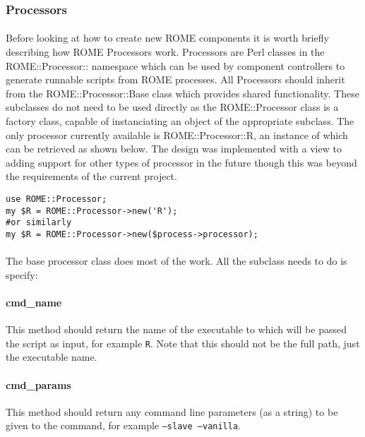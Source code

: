 \subsubsection{Processors}
\label{sec:model_processors}

\paragraph{}
Before looking at how to create new ROME components it is worth briefly describing how ROME Processors work. Processors are Perl classes in the ROME::Processor:: namespace which can be used by component controllers to generate runnable scripts from ROME processes. All Processors should inherit from the ROME::Processor::Base class which provides shared functionality. These subclasses do not need to be used directly as the ROME::Processor class is a factory class, capable of instanciating an object of the appropriate subclass. The only processor currently available is ROME::Processor::R, an instance of which can be retrieved as shown below. The design was implemented with a view to adding support for other types of processor in the future though this was beyond the requirements of the current project.

\begin{scriptsize}
\begin{verbatim}
use ROME::Processor;
my $R = ROME::Processor->new('R');
#or similarly
my $R = ROME::Processor->new($process->processor);
\end{verbatim}
\end{scriptsize}

\paragraph{}
The base processor class does most of the work. All the subclass needs to do is specify:

\paragraph{cmd\_name}
This method should return the name of the executable to which will be passed the script as input, for example \texttt{R}. Note that this should not be the full path, just the executable name.

\paragraph{cmd\_params}
This method should return any command line parameters (as a string) to be given to the command, for example \texttt{--slave --vanilla}.

